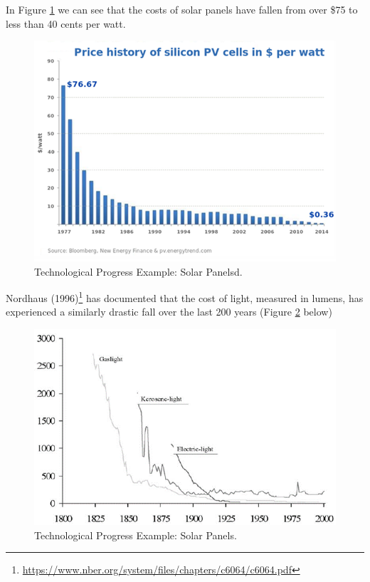 \documentclass[
]{book}
\begin{document}
In Figure \ref{fig:fig409} we can see that the costs of solar panels have fallen from over \$75 to less than 40 cents per watt.

\begin{figure}

{\centering \includegraphics[width=0.75\linewidth]{img/ch4/fig9} 

}

\caption{Technological Progress Example: Solar Panelsd.}\label{fig:fig409}
\end{figure}

Nordhaus (1996)\footnote{\url{https://www.nber.org/system/files/chapters/c6064/c6064.pdf}} has documented that the cost of light, measured in lumens, has experienced a similarly drastic fall over the last 200 years (Figure \ref{fig:fig410} below)

\begin{figure}

{\centering \includegraphics[width=0.75\linewidth]{img/ch4/fig10} 

}

\caption{Technological Progress Example: Solar Panels.}\label{fig:fig410}
\end{figure}
\end{document}
